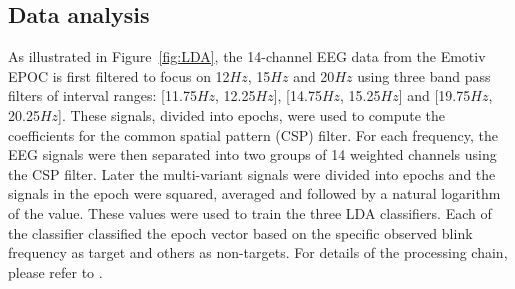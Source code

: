 \documentclass{svmult}
\begin{document}
\subsection{Data analysis}
As illustrated in Figure~\ref{fig:LDA}, the 14-channel EEG data from the Emotiv EPOC is first filtered to focus on 12$Hz$, 15$Hz$ and 20$Hz$ using three band pass filters of interval ranges: [11.75$Hz$, 12.25$Hz$], [14.75$Hz$, 15.25$Hz$] and [19.75$Hz$, 20.25$Hz$]. These signals, divided into epochs, were used to compute the coefficients for the common spatial pattern (CSP) filter. For each frequency, the EEG signals were then separated into two groups of 14 weighted channels using the CSP filter. Later the multi-variant signals were divided into epochs and the signals in the epoch were squared, averaged and followed by a natural logarithm of the value. These values were used to train the three LDA classifiers. Each of the classifier classified the epoch vector based on the specific observed blink frequency as target and others as non-targets. For details of the processing chain, please refer to \cite{openvibeSSVEP}. 
\end{document}
